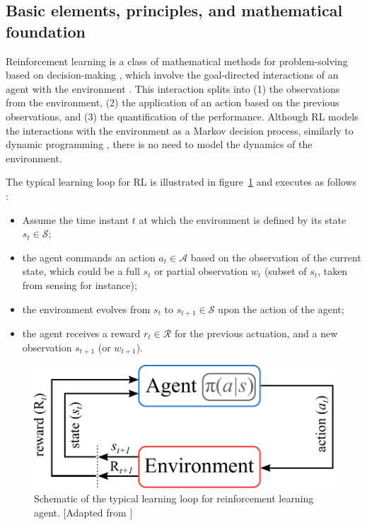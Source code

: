 \subsection{Basic elements, principles, and mathematical foundation}\label{ss:RLbasic}
%
Reinforcement learning is a class of mathematical methods for problem-solving based on decision-making \citep{sutton2018reinforcement}, which involve the goal-directed interactions of an agent with the environment \citep{BruntonNoackKoumoutsakos2020}. This interaction splits into (1) the observations from the environment, (2) the application of an action based on the previous observations, and (3) the quantification of the performance. Although RL models the interactions with the environment as a Markov decision process, similarly to dynamic programming \citep{Bellman1952dyprog}, there is no need to model the dynamics of the environment.

The typical learning loop for RL is illustrated in figure~\ref{fig:RL_loop} and executes as follows \citep{Viquerat2021RLrev}:
%
\begin{itemize}
    \item Assume the time instant $t$ at which the environment is defined by its state $s_t \in \mathcal{S}$;
    \item the agent commands an action $a_t \in \mathcal{A}$ based on the observation of the current state, which could be a full $s_t$ or partial observation $w_t$ (subset of $s_t$, taken from sensing for instance);
    \item the environment evolves from $s_t$ to $s_{t+1} \in \mathcal{S}$ upon the action of the agent;
    \item the agent receives a reward $r_t \in \mathcal{R}$ for the previous actuation, and a new observation $s_{t+1}$ (or $w_{t+1}$).
\end{itemize}
%
\begin{figure}
    \centering
    \includegraphics[width = 0.6\linewidth]{figures/RL_loop.pdf}
    \caption{Schematic of the typical learning loop for reinforcement learning agent. [Adapted from \citet{sutton2018reinforcement}]}
    \label{fig:RL_loop}
\end{figure}

